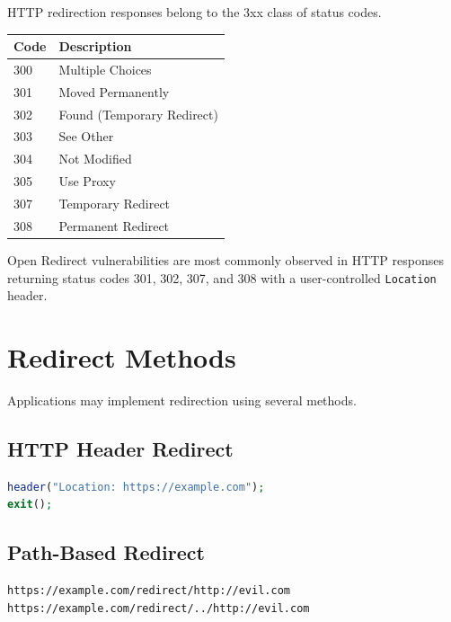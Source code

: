 \documentclass{article}
\begin{document}
HTTP redirection responses belong to the 3xx class of status codes.

\begin{longtable}{p{2cm}p{11cm}}
\toprule
\textbf{Code} & \textbf{Description} \\
\midrule
300 & Multiple Choices \\
301 & Moved Permanently \\
302 & Found (Temporary Redirect) \\
303 & See Other \\
304 & Not Modified \\
305 & Use Proxy \\
307 & Temporary Redirect \\
308 & Permanent Redirect \\
\bottomrule
\end{longtable}

\begin{notebox}
Open Redirect vulnerabilities are most commonly observed in HTTP responses returning status codes 301, 302, 307, and 308 with a user-controlled \texttt{Location} header.
\end{notebox}


\section{Redirect Methods}

Applications may implement redirection using several methods.

\subsection{HTTP Header Redirect}

\begin{lstlisting}[language=PHP]
header("Location: https://example.com");
exit();
\end{lstlisting}

\subsection{Path-Based Redirect}

\begin{lstlisting}
https://example.com/redirect/http://evil.com
https://example.com/redirect/../http://evil.com
\end{lstlisting}
\end{document}
